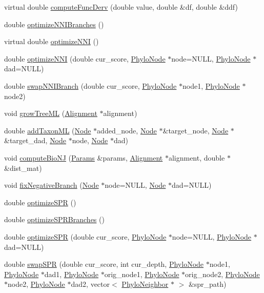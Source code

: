 \begin{DoxyCompactItemize}
\item 
virtual double \hyperlink{classPhyloTree_a9ae5f61aa0d22976b2d2e8f3ed15f44f}{computeFuncDerv} (double value, double \&df, double \&ddf)
\item 
double \hyperlink{classPhyloTree_acef313906a2021de5de2eb87226a202d}{optimizeNNIBranches} ()
\item 
virtual double \hyperlink{classPhyloTree_a8927dbf75a06ea797cc76b619759985d}{optimizeNNI} ()
\item 
double \hyperlink{classPhyloTree_abd42e1cc3b3da9e0d00ea00182a031d2}{optimizeNNI} (double cur\_\-score, \hyperlink{classPhyloNode}{PhyloNode} $\ast$node=NULL, \hyperlink{classPhyloNode}{PhyloNode} $\ast$dad=NULL)
\item 
double \hyperlink{classPhyloTree_ab846b2730dd57366d4d5c8412870cd9a}{swapNNIBranch} (double cur\_\-score, \hyperlink{classPhyloNode}{PhyloNode} $\ast$node1, \hyperlink{classPhyloNode}{PhyloNode} $\ast$node2)
\item 
void \hyperlink{classPhyloTree_a2de074f797940b19f9b1e923fe6c814a}{growTreeML} (\hyperlink{classAlignment}{Alignment} $\ast$alignment)
\item 
double \hyperlink{classPhyloTree_aa5fdafe246a24235967981a2df3faffb}{addTaxonML} (\hyperlink{classNode}{Node} $\ast$added\_\-node, \hyperlink{classNode}{Node} $\ast$\&target\_\-node, \hyperlink{classNode}{Node} $\ast$\&target\_\-dad, \hyperlink{classNode}{Node} $\ast$node, \hyperlink{classNode}{Node} $\ast$dad)
\item 
void \hyperlink{classPhyloTree_a760299b108adf89646a22ab1ad195cda}{computeBioNJ} (\hyperlink{structParams}{Params} \&params, \hyperlink{classAlignment}{Alignment} $\ast$alignment, double $\ast$\&dist\_\-mat)
\item 
void \hyperlink{classPhyloTree_a80df879587ccb9aa1b9b54103e87ab8a}{fixNegativeBranch} (\hyperlink{classNode}{Node} $\ast$node=NULL, \hyperlink{classNode}{Node} $\ast$dad=NULL)
\item 
double \hyperlink{classPhyloTree_ae2a229415387b5eb9f36c3bb078b6d80}{optimizeSPR} ()
\item 
double \hyperlink{classPhyloTree_a071475b37be90fb615e26b38d72a574f}{optimizeSPRBranches} ()
\item 
double \hyperlink{classPhyloTree_a726b99499f5a40395fc3c825d2d0a9ad}{optimizeSPR} (double cur\_\-score, \hyperlink{classPhyloNode}{PhyloNode} $\ast$node=NULL, \hyperlink{classPhyloNode}{PhyloNode} $\ast$dad=NULL)
\item 
double \hyperlink{classPhyloTree_a50a289b7af25842a1401856fee67d725}{swapSPR} (double cur\_\-score, int cur\_\-depth, \hyperlink{classPhyloNode}{PhyloNode} $\ast$node1, \hyperlink{classPhyloNode}{PhyloNode} $\ast$dad1, \hyperlink{classPhyloNode}{PhyloNode} $\ast$orig\_\-node1, \hyperlink{classPhyloNode}{PhyloNode} $\ast$orig\_\-node2, \hyperlink{classPhyloNode}{PhyloNode} $\ast$node2, \hyperlink{classPhyloNode}{PhyloNode} $\ast$dad2, vector$<$ \hyperlink{classPhyloNeighbor}{PhyloNeighbor} $\ast$ $>$ \&spr\_\-path)

\end{DoxyCompactItemize}

